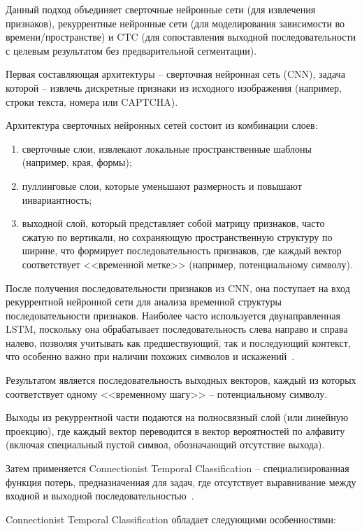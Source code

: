 Данный подход объединяет сверточные нейронные сети (для извлечения признаков), 
рекуррентные нейронные сети (для моделирования зависимости во 
времени/пространстве) и CTC (для сопоставления выходной последовательности с 
целевым результатом без предварительной сегментации).

Первая составляющая архитектуры -- сверточная нейронная сеть (CNN), задача 
которой -- извлечь дискретные признаки из исходного изображения (например, строки 
текста, номера или CAPTCHA).

Архитектура сверточных нейронных сетей состоит из комбинации слоев:

\begin{enumerate}
    \item сверточные слои, извлекают локальные пространственные шаблоны 
    (например, края, формы);
    \item пуллинговые слои, которые уменьшают размерность и повышают 
    инвариантность;
    \item выходной слой, который представляет собой матрицу признаков, часто 
    сжатую по вертикали, но сохраняющую пространственную структуру по ширине, 
    что формирует последовательность признаков, где каждый вектор соответствует 
    <<временной метке>> (например, потенциальному символу).
\end{enumerate}

После получения последовательности признаков из CNN, она поступает на вход 
рекуррентной нейронной сети для анализа временной структуры последовательности 
признаков. Наиболее часто используется двунаправленная LSTM, поскольку она 
обрабатывает последовательность слева направо и справа налево, позволяя учитывать 
как предшествующий, так и последующий контекст, что особенно важно при наличии 
похожих символов и искажений~\cite{crnnbook}.

Результатом является последовательность выходных векторов, каждый из которых 
соответствует одному <<временному шагу>> -- потенциальному символу.

Выходы из рекуррентной части подаются на полносвязный слой (или линейную 
проекцию), где каждый вектор переводится в вектор вероятностей по алфавиту 
(включая специальный пустой символ, обозначающий отсутствие выхода).

Затем применяется Connectionist Temporal Classification -- специализированная 
функция потерь, предназначенная для задач, где отсутствует выравнивание между 
входной и выходной последовательностью~\cite{ctc}.

Connectionist Temporal Classification обладает следующими особенностями:

